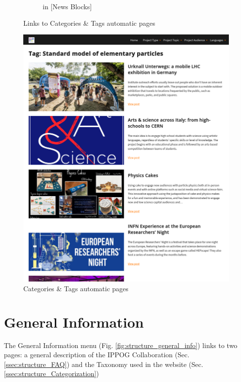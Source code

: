 \begin{figure}[th]
\begin{subfigure}[c]{.4\textwidth}
        \caption{in [News Blocks]}
        \label{fig:structure_auto3}
    \end{subfigure}
    \caption{Links to Categories \& Tags automatic pages}
\end{figure}

\begin{figure}[p]
    \centering
    \includegraphics[width=\linewidth]{Image/Architecture/structure_auto.png}
    \caption{Categories \& Tags automatic pages}
    \label{fig:structure_auto}
\end{figure}

\newpage

\section{General Information}\label{sec:structure_genaralinfo}

The General Information menu (Fig. \ref{fig:structure_general_info}) links to two pages: a general description of the IPPOG Collaboration (Sec. \ref{ssec:structure_FAQ}) and the Taxonomy used in the website (Sec. \ref{ssec:structure_Categorization})

